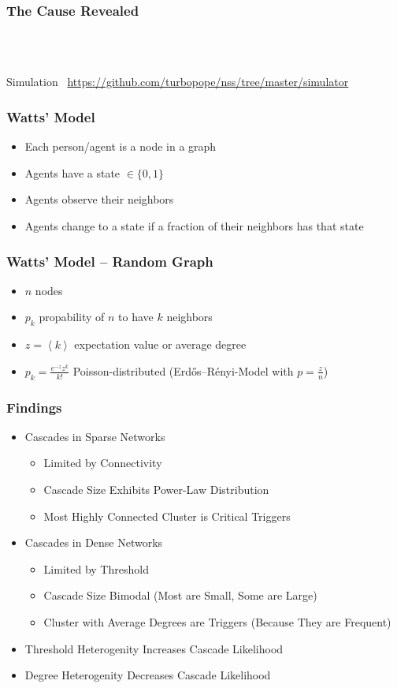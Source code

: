 \documentclass[slidestop,usenames,dvipsnames]{beamer}
\newcommand{\fitem}{\pause\vfill\item}
\newcommand{\gitem}{\vfill\item}
\begin{document}
\begin{frame}
    \frametitle{The Cause Revealed}
    \vfill
    \begin{center}
        \\
        \vspace{20pt}
        \\
        \vspace{20pt}
    \end{center}
    \vfill
\end{frame}

\begin{frame}
    \vfill
    \begin{center}
        {\Huge Simulation}\
        \vfill
        \url{https://github.com/turbopope/nss/tree/master/simulator}
    \end{center}
\end{frame}



\begin{frame}
    \frametitle{Watts' Model}
    \begin{itemize}
        \gitem Each person/agent is a node in a graph
        \gitem Agents have a state $\in \lbrace 0, 1 \rbrace$
        \gitem Agents observe their neighbors
        \gitem Agents change to a state if a fraction of their neighbors has that state
    \end{itemize}
    \vfill
\end{frame}

\begin{frame}
    \frametitle{Watts' Model -- Random Graph}
    \begin{itemize}
        \fitem $n$ nodes
        \fitem $p_k$ propability of $n$ to have $k$ neighbors
        \fitem $z = \left<k\right>$ expectation value or average degree
        \fitem $p_k = \frac{e^{-z}z^k}{k!}$ Poisson-distributed (Erdős–Rényi-Model with $p = \frac{z}{n}$)
    \end{itemize}
    \vfill
\end{frame}

\begin{frame}
  \frametitle{Findings}
  \begin{itemize}
    \fitem Cascades in Sparse Networks
    \begin{itemize}
      \fitem Limited by Connectivity
      \fitem Cascade Size Exhibits Power-Law Distribution
      \fitem Most Highly Connected Cluster is Critical Triggers
    \end{itemize}
    \fitem Cascades in Dense Networks
    \begin{itemize}
        \fitem Limited by Threshold
        \fitem Cascade Size Bimodal (Most are Small, Some are Large)
        \fitem Cluster with Average Degrees are Triggers (Because They are Frequent)
      \end{itemize}
    \fitem Threshold Heterogenity Increases Cascade Likelihood
    \fitem Degree Heterogenity Decreases Cascade Likelihood
  \end{itemize}
  \vfill
\end{frame}
\end{document}
